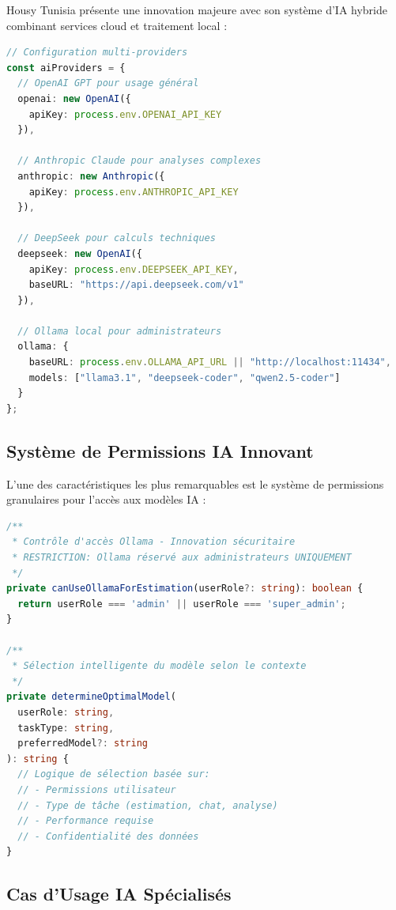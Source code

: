 Housy Tunisia présente une innovation majeure avec son système d'IA hybride combinant services cloud et traitement local :

\begin{lstlisting}[language=TypeScript, caption=Configuration des providers IA]
// Configuration multi-providers
const aiProviders = {
  // OpenAI GPT pour usage général
  openai: new OpenAI({ 
    apiKey: process.env.OPENAI_API_KEY 
  }),
  
  // Anthropic Claude pour analyses complexes
  anthropic: new Anthropic({
    apiKey: process.env.ANTHROPIC_API_KEY
  }),
  
  // DeepSeek pour calculs techniques
  deepseek: new OpenAI({
    apiKey: process.env.DEEPSEEK_API_KEY,
    baseURL: "https://api.deepseek.com/v1"
  }),
  
  // Ollama local pour administrateurs
  ollama: {
    baseURL: process.env.OLLAMA_API_URL || "http://localhost:11434",
    models: ["llama3.1", "deepseek-coder", "qwen2.5-coder"]
  }
};
\end{lstlisting}

\subsection{Système de Permissions IA Innovant}

L'une des caractéristiques les plus remarquables est le système de permissions granulaires pour l'accès aux modèles IA :

\begin{lstlisting}[language=TypeScript, caption=Contrôle d'accès IA par rôle]
/**
 * Contrôle d'accès Ollama - Innovation sécuritaire
 * RESTRICTION: Ollama réservé aux administrateurs UNIQUEMENT
 */
private canUseOllamaForEstimation(userRole?: string): boolean {
  return userRole === 'admin' || userRole === 'super_admin';
}

/**
 * Sélection intelligente du modèle selon le contexte
 */
private determineOptimalModel(
  userRole: string, 
  taskType: string,
  preferredModel?: string
): string {
  // Logique de sélection basée sur:
  // - Permissions utilisateur
  // - Type de tâche (estimation, chat, analyse)
  // - Performance requise
  // - Confidentialité des données
}
\end{lstlisting}

\subsection{Cas d'Usage IA Spécialisés}


